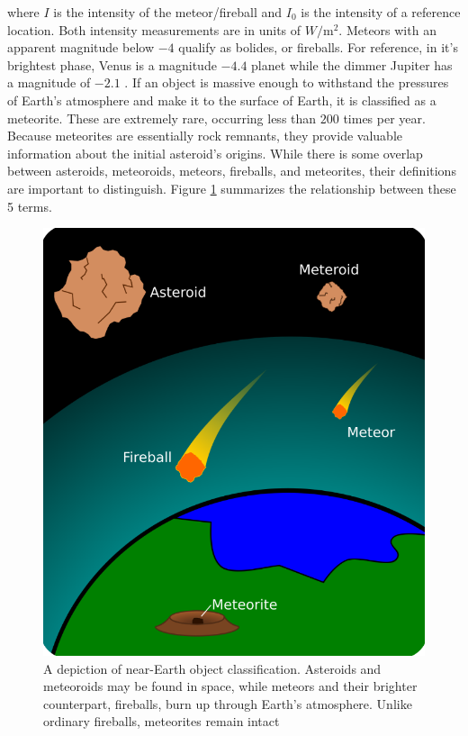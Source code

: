 where $I$ is the intensity of the meteor/fireball and $I_0$ is the intensity of a reference location.  
Both intensity measurements are in units of $\si{W/\meter^2}$.
Meteors with an apparent magnitude below $-4$ qualify as bolides, or fireballs.
For reference, in it's brightest phase, Venus is a magnitude $-4.4$ planet while the dimmer Jupiter has a magnitude of $-2.1$ \cite{rao_venus_nodate}.
If an object is massive enough to withstand the pressures of Earth's atmosphere and make it to the surface of Earth, it is classified as a meteorite. 
These are extremely rare, occurring less than $200$ times per year.
Because meteorites are essentially rock remnants, they provide valuable information about the initial asteroid's origins.
While there is some overlap between asteroids, meteoroids, meteors, fireballs, and meteorites, their definitions are important to distinguish.
Figure \ref{jed} summarizes the relationship between these 5 terms.

\begin{figure}[ht!]
  \centering
  \includegraphics[scale=0.3]{images/jed_zoomedin.png}
  \caption{A depiction of near-Earth object classification.  Asteroids and meteoroids may be found in space, while meteors and their brighter counterpart, fireballs, burn up through Earth's atmosphere.  Unlike ordinary fireballs, meteorites remain intact }
  \label{jed}
\end{figure}

